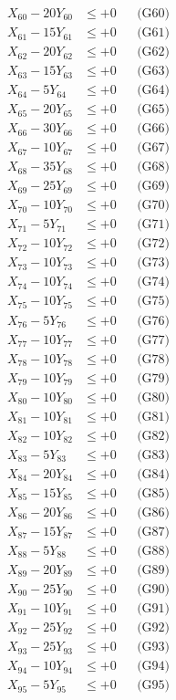 \documentclass[a4paper,10pt]{article}
\begin{document}
{\begin{align}
\allowbreak
X_{60} - 20Y_{60} &\leq +0 && \text{(G60)} \\
X_{61} - 15Y_{61} &\leq +0 && \text{(G61)} \\
X_{62} - 20Y_{62} &\leq +0 && \text{(G62)} \\
X_{63} - 15Y_{63} &\leq +0 && \text{(G63)} \\
X_{64} - 5Y_{64} &\leq +0 && \text{(G64)} \\
X_{65} - 20Y_{65} &\leq +0 && \text{(G65)} \\
X_{66} - 30Y_{66} &\leq +0 && \text{(G66)} \\
X_{67} - 10Y_{67} &\leq +0 && \text{(G67)} \\
X_{68} - 35Y_{68} &\leq +0 && \text{(G68)} \\
X_{69} - 25Y_{69} &\leq +0 && \text{(G69)} \\
\allowbreak
X_{70} - 10Y_{70} &\leq +0 && \text{(G70)} \\
X_{71} - 5Y_{71} &\leq +0 && \text{(G71)} \\
X_{72} - 10Y_{72} &\leq +0 && \text{(G72)} \\
X_{73} - 10Y_{73} &\leq +0 && \text{(G73)} \\
X_{74} - 10Y_{74} &\leq +0 && \text{(G74)} \\
X_{75} - 10Y_{75} &\leq +0 && \text{(G75)} \\
X_{76} - 5Y_{76} &\leq +0 && \text{(G76)} \\
X_{77} - 10Y_{77} &\leq +0 && \text{(G77)} \\
X_{78} - 10Y_{78} &\leq +0 && \text{(G78)} \\
X_{79} - 10Y_{79} &\leq +0 && \text{(G79)} \\
\allowbreak
X_{80} - 10Y_{80} &\leq +0 && \text{(G80)} \\
X_{81} - 10Y_{81} &\leq +0 && \text{(G81)} \\
X_{82} - 10Y_{82} &\leq +0 && \text{(G82)} \\
X_{83} - 5Y_{83} &\leq +0 && \text{(G83)} \\
X_{84} - 20Y_{84} &\leq +0 && \text{(G84)} \\
X_{85} - 15Y_{85} &\leq +0 && \text{(G85)} \\
X_{86} - 20Y_{86} &\leq +0 && \text{(G86)} \\
X_{87} - 15Y_{87} &\leq +0 && \text{(G87)} \\
X_{88} - 5Y_{88} &\leq +0 && \text{(G88)} \\
X_{89} - 20Y_{89} &\leq +0 && \text{(G89)} \\
\allowbreak
X_{90} - 25Y_{90} &\leq +0 && \text{(G90)} \\
X_{91} - 10Y_{91} &\leq +0 && \text{(G91)} \\
X_{92} - 25Y_{92} &\leq +0 && \text{(G92)} \\
X_{93} - 25Y_{93} &\leq +0 && \text{(G93)} \\
X_{94} - 10Y_{94} &\leq +0 && \text{(G94)} \\
X_{95} - 5Y_{95} &\leq +0 && \text{(G95)} \\
\end{align}
}
\end{document}
